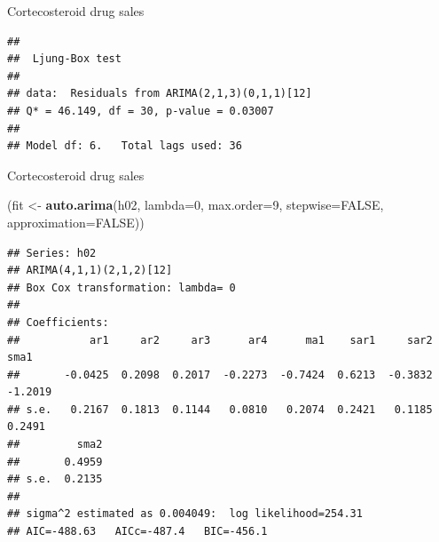 \documentclass[14pt,ignorenonframetext,]{beamer}
\newenvironment{Shaded}{\begin{snugshade}}{\end{snugshade}}
\newcommand{\KeywordTok}[1]{\textcolor[rgb]{0.13,0.29,0.53}{\textbf{#1}}}
\newcommand{\DataTypeTok}[1]{\textcolor[rgb]{0.13,0.29,0.53}{#1}}
\newcommand{\DecValTok}[1]{\textcolor[rgb]{0.00,0.00,0.81}{#1}}
\newcommand{\StringTok}[1]{\textcolor[rgb]{0.31,0.60,0.02}{#1}}
\newcommand{\OtherTok}[1]{\textcolor[rgb]{0.56,0.35,0.01}{#1}}
\newcommand{\NormalTok}[1]{#1}
\begin{document}
\begin{frame}[fragile]{Cortecosteroid drug sales}

\fontsize{11}{15}\sf

\begin{verbatim}
## 
##  Ljung-Box test
## 
## data:  Residuals from ARIMA(2,1,3)(0,1,1)[12]
## Q* = 46.149, df = 30, p-value = 0.03007
## 
## Model df: 6.   Total lags used: 36
\end{verbatim}

\end{frame}

\begin{frame}[fragile]{Cortecosteroid drug sales}

\fontsize{8}{10}\sf

\begin{Shaded}
\begin{Highlighting}[]
\NormalTok{(fit <-}\StringTok{ }\KeywordTok{auto.arima}\NormalTok{(h02, }\DataTypeTok{lambda=}\DecValTok{0}\NormalTok{, }\DataTypeTok{max.order=}\DecValTok{9}\NormalTok{,}
  \DataTypeTok{stepwise=}\OtherTok{FALSE}\NormalTok{, }\DataTypeTok{approximation=}\OtherTok{FALSE}\NormalTok{))}
\end{Highlighting}
\end{Shaded}

\begin{verbatim}
## Series: h02 
## ARIMA(4,1,1)(2,1,2)[12] 
## Box Cox transformation: lambda= 0 
## 
## Coefficients:
##           ar1     ar2     ar3      ar4      ma1    sar1     sar2     sma1
##       -0.0425  0.2098  0.2017  -0.2273  -0.7424  0.6213  -0.3832  -1.2019
## s.e.   0.2167  0.1813  0.1144   0.0810   0.2074  0.2421   0.1185   0.2491
##         sma2
##       0.4959
## s.e.  0.2135
## 
## sigma^2 estimated as 0.004049:  log likelihood=254.31
## AIC=-488.63   AICc=-487.4   BIC=-456.1
\end{verbatim}

\end{frame}
\end{document}
